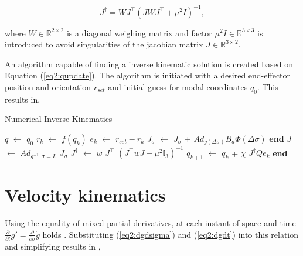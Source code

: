 \begin{equation}
    J^\dagger = WJ^\top(JWJ^\top + \mu^2 I)^{-1}
    \label{eq2:pseudoinverse},
\end{equation}

where $W \in \mathbb{R}^{2\times 2}$ is a diagonal weighing matrix and factor $\mu^2 I \in \mathbb{R}^{3 \times 3}$ is introduced to avoid singularities of the jacobian matrix $J \in \mathbb{R}^{3 \times 2}$. 

An algorithm capable of finding a inverse kinematic solution is created based on Equation (\ref{eq2:qupdate}). The algorithm is initiated with a desired end-effector position and orientation $r_{set}$ and initial guess for modal coordinates $q_0$. This results in,


\begin{algorithm}[H]
\caption{Numerical Inverse Kinematics}
\begin{algorithmic}[1]
\State $q$ $\leftarrow$ $q_0$ 
      
    \State $r_k$ $\leftarrow$ $f(q_k)$  
     \State $e_k$ $\leftarrow$ $r_{set} - r_{k}$ 
            \State $J_{\sigma}$ $\leftarrow$  $J_{\sigma}$ + $Ad_{g(\Delta \sigma)} B_a \Phi(\Delta \sigma)$ 
        \EndFor
    \State \textbf{end}
    \State $J$ $\leftarrow$ $Ad_{g^{-1},\sigma=L}$ $J_{\sigma}$ 
    \State $J^{\dagger}$ $\leftarrow$  $w$ $J^{\top}$ $(J^\top w J - \mu^2 \mathbb{I}_3)^{-1}$ 
    \State $q_{k+1}$  $\leftarrow$ $q_{k}$ + $\chi$ $J^{\dagger} Q e_k$ 
\EndWhile 
\State \textbf{end}
    \label{alg2:numericalinverse}
\end{algorithmic}
\end{algorithm}


\section{Velocity kinematics}


Using the equality of mixed partial derivatives, at each instant of space and time $\frac{\partial}{\partial t}g' = \frac{\partial}{\partial \sigma}\dot{g}$ holds \cite{Caasenbrood2020}. Substituting (\ref{eq2:dgdsigma}) and (\ref{eq2:dgdt}) into this relation and simplifying results in \cite{Caasenbrood2020},

